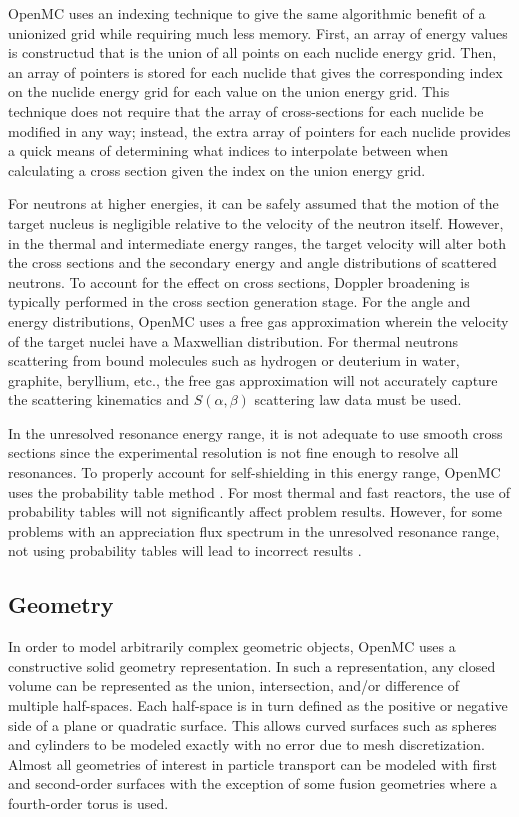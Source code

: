 \documentclass{elsarticle}
\begin{document}
OpenMC uses an indexing technique to give the same algorithmic benefit of a
unionized grid while requiring much less memory. First, an array of energy
values is constructud that is the union of all points on each nuclide energy
grid. Then, an array of pointers is stored for each nuclide that gives the
corresponding index on the nuclide energy grid for each value on the union
energy grid. This technique does not require that the array of cross-sections
for each nuclide be modified in any way; instead, the extra array of pointers
for each nuclide provides a quick means of determining what indices to
interpolate between when calculating a cross section given the index on the
union energy grid.

For neutrons at higher energies, it can be safely assumed that the motion of the
target nucleus is negligible relative to the velocity of the neutron
itself. However, in the thermal and intermediate energy ranges, the target
velocity will alter both the cross sections and the secondary energy and angle
distributions of scattered neutrons. To account for the effect on cross
sections, Doppler broadening is typically performed in the cross section
generation stage. For the angle and energy distributions, OpenMC uses a free gas
approximation \cite{freegas} wherein the velocity of the target nuclei have a
Maxwellian distribution. For thermal neutrons scattering from bound molecules
such as hydrogen or deuterium in water, graphite, beryllium, etc., the free gas
approximation will not accurately capture the scattering kinematics and
$S(\alpha,\beta)$ scattering law data must be used.

In the unresolved resonance energy range, it is not adequate to use smooth cross
sections since the experimental resolution is not fine enough to resolve all
resonances. To properly account for self-shielding in this energy range, OpenMC
uses the probability table method \cite{probtables}. For most thermal and fast
reactors, the use of probability tables will not significantly affect problem
results. However, for some problems with an appreciation flux spectrum in the
unresolved resonance range, not using probability tables will lead to incorrect
results \cite{probtables-testing}.

\subsection{Geometry}

In order to model arbitrarily complex geometric objects, OpenMC uses a
constructive solid geometry representation. In such a representation, any closed
volume can be represented as the union, intersection, and/or difference of
multiple half-spaces. Each half-space is in turn defined as the positive or
negative side of a plane or quadratic surface. This allows curved surfaces such
as spheres and cylinders to be modeled exactly with no error due to mesh
discretization. Almost all geometries of interest in particle transport can be
modeled with first and second-order surfaces with the exception of some fusion
geometries where a fourth-order torus is used.
\end{document}
